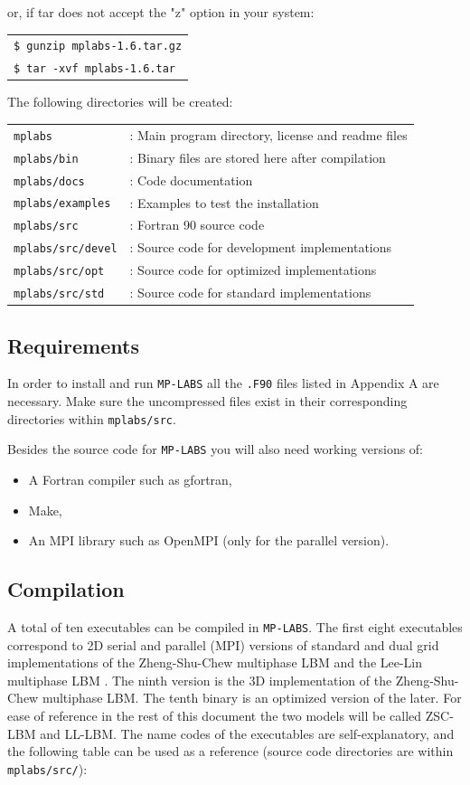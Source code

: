 \documentclass[12pt]{report}
\begin{document}
or, if tar does not accept the "z" option in your system:

\begin{tabular}{l}
\texttt{\$ gunzip mplabs-1.6.tar.gz}\\
\texttt{\$ tar -xvf mplabs-1.6.tar}
\end{tabular}

The following directories will be created:

\begin{tabular}{ll}
\texttt{mplabs}&: Main program directory, license and readme files\\
\texttt{mplabs/bin}&: Binary files are stored here after compilation\\
\texttt{mplabs/docs}&: Code documentation\\
\texttt{mplabs/examples}&: Examples to test the installation\\
\texttt{mplabs/src}&: Fortran 90 source code\\
\texttt{mplabs/src/devel}&: Source code for development implementations\\
\texttt{mplabs/src/opt}&: Source code for optimized implementations\\
\texttt{mplabs/src/std}&: Source code for standard implementations\\
\end{tabular}

\subsection{Requirements}
In order to install and run \verb+MP-LABS+ all the \verb+.F90+ files listed in Appendix A are necessary. Make sure the uncompressed files exist in their corresponding directories within \verb+mplabs/src+.

Besides the source code for \verb+MP-LABS+ you will also need working versions of:

\begin{itemize}
\item A Fortran compiler such as gfortran,
\item Make,
\item An MPI library such as OpenMPI \cite{openmpi} (only for the parallel version).
\end{itemize}

\subsection{Compilation}
\label{sec:compilation}
A total of ten executables can be compiled in \verb+MP-LABS+. The first eight executables correspond to 2D serial and parallel (MPI) versions of standard and dual grid implementations of the Zheng-Shu-Chew multiphase LBM \cite{Zheng2006} and the Lee-Lin multiphase LBM \cite{Lee2005}. The ninth version is the 3D implementation of the Zheng-Shu-Chew multiphase LBM. The tenth binary is an optimized version of the later. For ease of reference in the rest of this document the two models will be called ZSC-LBM and LL-LBM. The name codes of the executables are self-explanatory, and the following table can be used as a reference (source code directories are within \texttt{mplabs/src/}):
\end{document}
